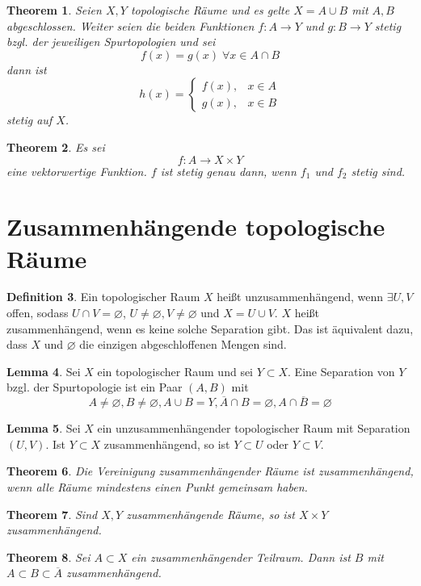 \documentclass[a4paper, 12pt]{article}
\theoremstyle{plain}
\newtheorem{theorem}{Theorem}[section] %
\theoremstyle{definition}
\newtheorem{definition}[theorem]{Definition} %
\theoremstyle{lemma}
\newtheorem{lemma}[theorem]{Lemma}
\theoremstyle{remark}
\theoremstyle{corollary}
\theoremstyle{example}
\begin{document}
	\begin{theorem}
		Seien $X,Y$ topologische Räume und es gelte $X = A\cup B$ mit $A,B$ abgeschlossen. Weiter seien die beiden Funktionen $f:A\to Y$ und $g:B \to Y$ stetig bzgl. der jeweiligen Spurtopologien und sei \[f(x) = g(x) \; \forall x \in A \cap B\] dann ist \[h(x) = \begin{cases}
			f(x), & x \in A\\
			g(x), & x \in B
		\end{cases}\] stetig auf $X$.
	\end{theorem}
	\begin{theorem}
		Es sei \[f:A \to X\times Y\] eine vektorwertige Funktion. $f$ ist stetig genau dann, wenn $f_1$ und $f_2$ stetig sind.
	\end{theorem}
	\section{Zusammenhängende topologische Räume}
	\begin{definition}
		Ein topologischer Raum $X$ heißt unzusammenhängend, wenn $\exists U,V$ offen, sodass $U\cap V = \varnothing$, $U \neq \varnothing, V \neq \varnothing$ und $X = U\cup V$. $X$ heißt zusammenhängend, wenn es keine solche Separation gibt. Das ist äquivalent dazu, dass $X$ und $\varnothing$ die einzigen abgeschloffenen Mengen sind.
	\end{definition}
	\begin{lemma}
		Sei $X$ ein topologischer Raum und sei $Y\subset X$. Eine Separation von $Y$ bzgl. der Spurtopologie ist ein Paar $(A,B)$ mit \[A\neq \varnothing, B \neq \varnothing, A\cup B = Y, \overline{A}\cap B = \varnothing, A \cap \overline{B} = \varnothing\]
	\end{lemma}
	\begin{lemma}
		Sei $X$ ein unzusammenhängender topologischer Raum mit Separation $(U,V)$. Ist $Y\subset X$ zusammenhängend, so ist $Y\subset U$ oder $Y\subset V$. 
	\end{lemma}
	\begin{theorem}
		Die Vereinigung zusammenhängender Räume ist zusammenhängend, wenn alle Räume mindestens einen Punkt gemeinsam haben.
	\end{theorem}
	\begin{theorem}
		Sind $X,Y$ zusammenhängende Räume, so ist $X\times Y$ zusammenhängend.
	\end{theorem}
	\begin{theorem}
		Sei $A\subset X$ ein zusammenhängender Teilraum. Dann ist $B$ mit $A\subset B \subset \overline{A}$ zusammenhängend.
	\end{theorem}
\end{document}

